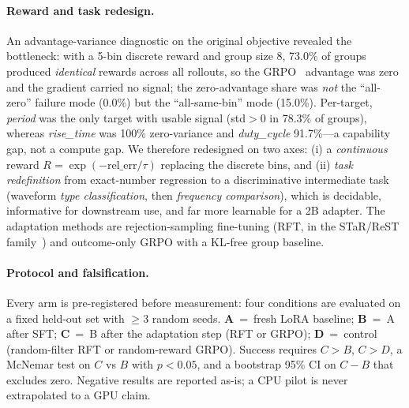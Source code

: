 \paragraph{Reward and task redesign.}
An advantage-variance diagnostic on the original objective revealed the bottleneck: with a 5-bin discrete reward and group size 8, 73.0\% of groups produced \emph{identical} rewards across all rollouts, so the GRPO~\cite{shao2024deepseekmath} advantage was zero and the gradient carried no signal; the zero-advantage share was \emph{not} the ``all-zero'' failure mode (0.0\%) but the ``all-same-bin'' mode (15.0\%). Per-target, \emph{period} was the only target with usable signal (std$>$0 in 78.3\% of groups), whereas \emph{rise\_time} was 100\% zero-variance and \emph{duty\_cycle} 91.7\%---a capability gap, not a compute gap. We therefore redesigned on two axes: (i) a \emph{continuous} reward $R=\exp(-\mathrm{rel\_err}/\tau)$ replacing the discrete bins, and (ii) \emph{task redefinition} from exact-number regression to a discriminative intermediate task (waveform \emph{type classification}, then \emph{frequency comparison}), which is decidable, informative for downstream use, and far more learnable for a 2B adapter. The adaptation methods are rejection-sampling fine-tuning (RFT, in the STaR/ReST family~\cite{zelikman2022star,gulcehre2023rest}) and outcome-only GRPO with a KL-free group baseline.

\paragraph{Protocol and falsification.}
Every arm is pre-registered before measurement: four conditions are evaluated on a fixed held-out set with $\geq 3$ random seeds. \textbf{A}~=~fresh LoRA baseline; \textbf{B}~=~A after SFT; \textbf{C}~=~B after the adaptation step (RFT or GRPO); \textbf{D}~=~control (random-filter RFT or random-reward GRPO). Success requires $C{>}B$, $C{>}D$, a McNemar test on $C$ vs $B$ with $p{<}0.05$, and a bootstrap 95\% CI on $C{-}B$ that excludes zero. Negative results are reported as-is; a CPU pilot is never extrapolated to a GPU claim.

